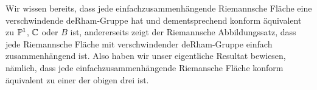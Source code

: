\begin{rem}
  Wir wissen bereits, dass jede einfachzusammenhängende Riemannsche
  Fläche eine verschwindende deRham-Gruppe hat und dementsprechend
  konform äquivalent zu $\P^1$, $\C$ oder $B$ ist, andererseits zeigt
  der Riemannsche Abbildungssatz, dass jede Riemannsche Fläche mit
  verschwindender deRham-Gruppe einfach zusammenhängend ist. Also
  haben wir unser eigentliche Resultat bewiesen, nämlich, dass jede
  einfachzusammenhängende Riemansche Fläche konform äquivalent zu
  einer der obigen drei ist.
\end{rem}

